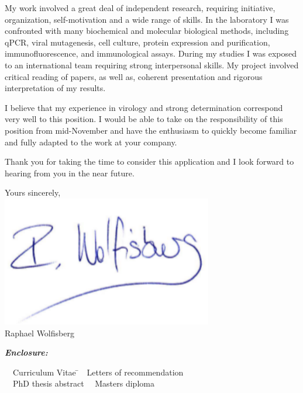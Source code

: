 \documentclass[11pt, a4paper]{article}
\begin{document}
\medskip
My work involved a great deal of independent research, requiring initiative, organization, self-motivation and a wide range of skills. In the laboratory I was confronted with many biochemical and molecular biological methods, including qPCR, viral mutagenesis, cell culture, protein expression and purification, immunofluorescence, and immunological assays. During my studies I was exposed to an international team requiring strong interpersonal skills. My project involved critical reading of papers, as well as, coherent presentation and rigorous interpretation of my results.

\medskip
I believe that my experience in virology and strong determination correspond very well to this position. I would be able to take on the responsibility of this position from mid-November and have the enthusiasm to quickly become familiar and fully adapted to the work at your company.

\bigskip
Thank you for taking the time to consider this application and I look forward to hearing from you in the near future.

\bigskip
\medskip
Yours sincerely, \\ [0.1 cm]
\includegraphics[scale=0.6, trim=0mm 3mm 0mm 0mm]{Signature} \\
Raphael Wolfisberg\\ 
\medskip

\textbf{\emph{Enclosure:}} \\

\vspace{-0.2 cm}
\begin{tabbing}

\textbullet~~Curriculum Vitae \hspace{6 cm} \= \textbullet~~Letters of recommendation \\
\textbullet~~PhD thesis abstract \> \textbullet~~Masters diploma

\end{tabbing}
\end{document}
